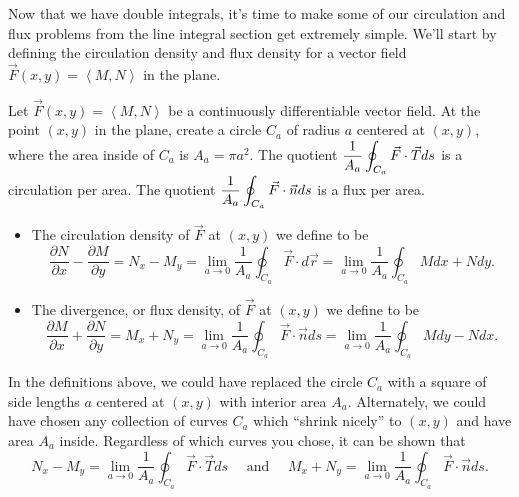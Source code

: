 \vskip0.2cm

Now that we have double integrals, it's time to make some of our circulation and flux problems from the line integral section get extremely simple. We'll start by defining the circulation density and flux density for a vector field $\vec F(x,y)=\left<M,N\right>$ in the plane.

\begin{definition}\label{definition of flux density in 2D}
Let $\vec F(x,y)=\left<M,N\right>$ be a continuously differentiable vector field. 
  At the point $(x,y)$ in the plane, create a circle $C_a$ of radius $a$ centered at $(x,y)$, where the area inside of $C_a$ is $A_a=\pi a^2$. The quotient $\displaystyle \frac{1}{A_a}\oint_{C_a} \vec F \cdot \vec T ds$ is a circulation per area.  The quotient $\displaystyle \frac{1}{A_a}\oint_{C_a} \vec F \cdot \vec n ds$ is a flux per area.
\begin{itemize}
 \item {}%
The circulation density of $\vec F$ at $(x,y)$ we define to be 
$$\frac{\partial N}{\partial x}-\frac{\partial M}{\partial y}=N_x-M_y = \lim_{a\to 0} \frac{1}{A_a}\oint_{C_a} \vec F \cdot  d\vec r = 
\lim_{a\to 0} \frac{1}{A_a}\oint_{C_a} Mdx+Ndy.$$ 
 \item The divergence, or flux density, of $\vec F$ at $(x,y)$ we define to be 
$$\frac{\partial M}{\partial x}+\frac{\partial N}{\partial y}=M_x+N_y=\lim_{a\to 0} \frac{1}{A_a}\oint_{C_a} \vec F \cdot \vec n ds = 
\lim_{a\to 0} \frac{1}{A_a}\oint_{C_a} Mdy-Ndx.$$
\end{itemize}
\end{definition}

In the definitions above, we could have replaced the circle $C_a$ with a square of side lengths $a$ centered at $(x,y)$ with interior area $A_a$. Alternately, we could have chosen any collection of curves $C_a$ which ``shrink nicely'' to $(x,y)$ and have area $A_a$ inside. Regardless of which curves you chose, it can be shown that 
$$N_x-M_y=\lim_{a\to 0} \frac{1}{A_a}\oint_{C_a} \vec F \cdot \vec T ds \quad \text{ and } \quad M_x+N_y=\lim_{a\to 0} \frac{1}{A_a}\oint_{C_a} \vec F \cdot \vec n ds.$$

